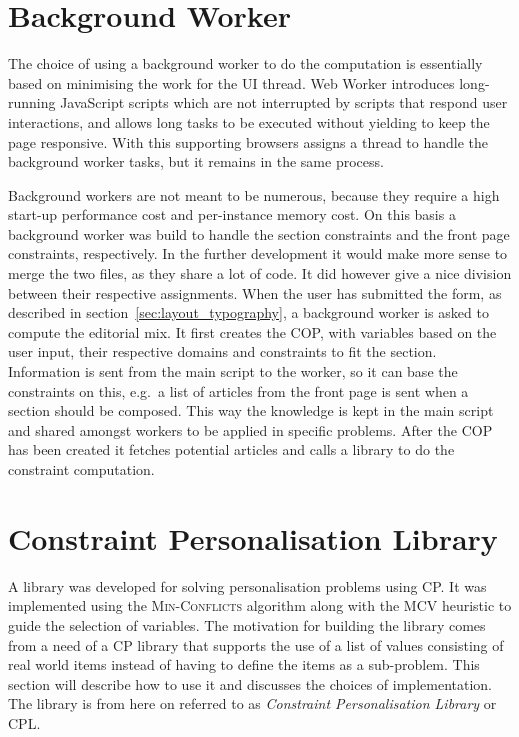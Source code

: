 \section{Background Worker}
The choice of using a background worker to do the computation is essentially based on minimising the work for the UI thread. Web Worker introduces long-running JavaScript scripts which are not interrupted by scripts that respond user interactions, and allows long tasks to be executed without yielding to keep the page responsive. With this supporting browsers assigns a thread to handle the background worker tasks, but it remains in the same process.

Background workers are not meant to be numerous, because they require a high start-up performance cost and per-instance memory cost. On this basis a background worker was build to handle the section constraints and the front page constraints, respectively. In the further development it would make more sense to merge the two files, as they share a lot of code. It did however give a nice division between their respective assignments. When the user has submitted the form, as described in section~\vref{sec:layout_typography}, a background worker is asked to compute the editorial mix. It first creates the COP, with variables based on the user input, their respective domains and constraints to fit the section. Information is sent from the main script to the worker, so it can base the constraints on this, e.g.\ a list of articles from the front page is sent when a section should be composed. This way the knowledge is kept in the main script and shared amongst workers to be applied in specific problems. After the COP has been created it fetches potential articles and calls a library to do the constraint computation.

\section{Constraint Personalisation Library}
A library was developed for solving personalisation problems using CP. It was implemented using the \textsc{Min-Conflicts} algorithm along with the MCV heuristic to guide the selection of variables. The motivation for building the library comes from a need of a CP library that supports the use of a list of values consisting of real world items instead of having to define the items as a sub-problem. This section will describe how to use it and discusses the choices of implementation. The library is from here on referred to as \emph{Constraint Personalisation Library} or CPL.%

